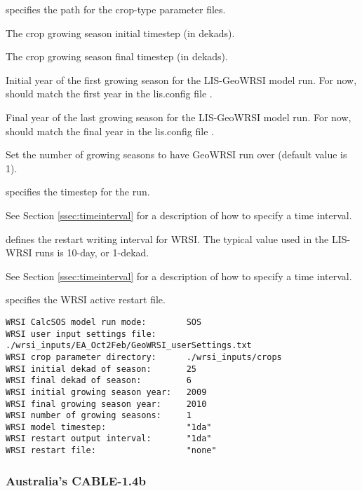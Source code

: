   specifies the path for the
 crop-type parameter files.

  The crop growing season
 initial timestep (in dekads).

  The crop growing season final
 timestep (in dekads).

  Initial year of the first
 growing season for the LIS-GeoWRSI model run.  For now, should
 match the first year in the lis.config file .

  Final year of the last
 growing season for the LIS-GeoWRSI model run.  For now, should
 match the final year in the lis.config file .

  Set the number of growing
 seasons to have GeoWRSI run over (default value is 1).

  specifies the timestep for the run.

 See Section \ref{ssec:timeinterval} for a description
 of how to specify a time interval.

  defines the restart
 writing  interval for WRSI. The typical value used in the
 LIS-WRSI runs is 10-day, or 1-dekad.

 See Section \ref{ssec:timeinterval} for a description
 of how to specify a time interval.

  specifies the WRSI active restart file.
 

 \begin{Verbatim}[frame=single]
WRSI CalcSOS model run mode:        SOS
WRSI user input settings file:      ./wrsi_inputs/EA_Oct2Feb/GeoWRSI_userSettings.txt
WRSI crop parameter directory:      ./wrsi_inputs/crops
WRSI initial dekad of season:       25
WRSI final dekad of season:         6
WRSI initial growing season year:   2009
WRSI final growing season year:     2010
WRSI number of growing seasons:     1
WRSI model timestep:                "1da"
WRSI restart output interval:       "1da"
WRSI restart file:                  "none"
 \end{Verbatim}

 
 
 \subsubsection{Australia's CABLE-1.4b} \label{sssec:lsm_cable14b}
 

